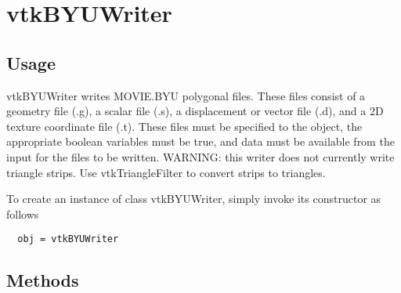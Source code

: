 \section{vtkBYUWriter}

\subsection{Usage}

 vtkBYUWriter writes MOVIE.BYU polygonal files. These files consist 
 of a geometry file (.g), a scalar file (.s), a displacement or 
 vector file (.d), and a 2D texture coordinate file (.t). These files 
 must be specified to the object, the appropriate boolean 
 variables must be true, and data must be available from the input
 for the files to be written.
 WARNING: this writer does not currently write triangle strips. Use
 vtkTriangleFilter to convert strips to triangles.

To create an instance of class vtkBYUWriter, simply
invoke its constructor as follows
\begin{verbatim}
  obj = vtkBYUWriter
\end{verbatim}
\subsection{Methods}

